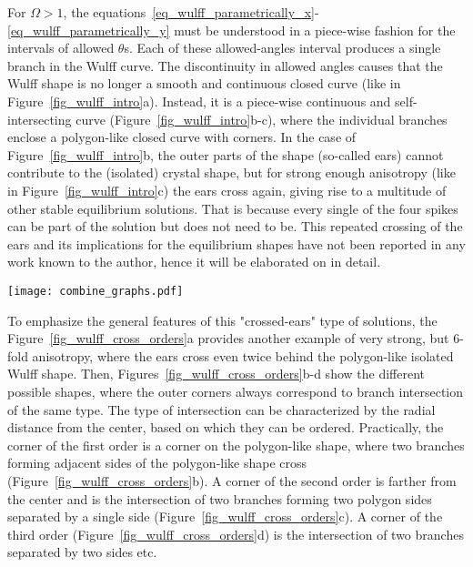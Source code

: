 	For $\Omega>1$, the equations~\eqref{eq_wulff_parametrically_x}-\eqref{eq_wulff_parametrically_y} must be understood in a piece-wise fashion for the intervals of allowed $\theta$s. Each of these allowed-angles interval produces a single branch in the Wulff curve. The discontinuity in allowed angles causes that the Wulff shape is no longer a smooth and continuous closed curve (like in Figure~\ref{fig_wulff_intro}a). Instead, it is a piece-wise continuous and self-intersecting curve (Figure~\ref{fig_wulff_intro}b-c), where the individual branches enclose a polygon-like closed curve with corners. In the case of Figure~\ref{fig_wulff_intro}b, the outer parts of the shape (so-called ears) cannot contribute to the (isolated) crystal shape, but for strong enough anisotropy (like in Figure~\ref{fig_wulff_intro}c) the ears cross again, giving rise to a multitude of other stable equilibrium solutions. That is because every single of the four spikes can be part of the solution but does not need to be. This repeated crossing of the ears and its implications for the equilibrium shapes have not been reported in any work known to the author, hence it will be elaborated on in detail. 
	
	\begin{figure*}[h]
		\centering
		\texttt{[image: combine\_graphs.pdf]}
		\caption{Orders of corners, defined by the branches intersections, shown for 6-fold anisotropy and $\delta=0.7$. In a) there are all the allowed angles, in b)-d) are the stable equilibrium shapes defined by the b) first order, c) second order and d) third order of the corners. Any closed curve is a stable equilibrium shape, which connects these corners along the allowed-angles branches and has the interface normals pointing outwards in every point.}
		\label{fig_wulff_cross_orders}
	\end{figure*}
	
	To emphasize the general features of this "crossed-ears" type of solutions, the Figure~\ref{fig_wulff_cross_orders}a provides another example of very strong, but 6-fold anisotropy, where the ears cross even twice behind the polygon-like isolated Wulff shape. Then, Figures~\ref{fig_wulff_cross_orders}b-d show the different possible shapes, where the outer corners always correspond to branch intersection of the same type. The type of intersection can be characterized by the radial distance from the center, based on which they can be ordered. Practically, the corner of the first order is a corner on the polygon-like shape, where two branches forming adjacent sides of the polygon-like shape cross (Figure~\ref{fig_wulff_cross_orders}b). A corner of the second order is farther from the center and is the intersection of two branches forming two polygon sides separated by a single side (Figure~\ref{fig_wulff_cross_orders}c). A corner of the third order (Figure~\ref{fig_wulff_cross_orders}d) is the intersection of two branches separated by two sides etc.
	
